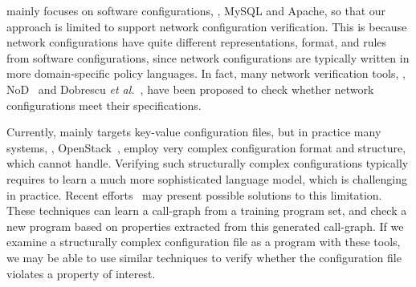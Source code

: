 \app mainly focuses on software configurations, \eg, MySQL and Apache,
so that our approach is limited to support network configuration
verification. This is because network configurations have quite
different representations, format, and rules from software configurations,
since network configurations are typically written in 
more domain-specific policy languages.
In fact, many network verification tools, 
\eg, NoD~\cite{lopes15checking} and 
Dobrescu {\em et al.}~\cite{dobrescu14software},
have been proposed to check whether network configurations
meet their specifications.

Currently, \app mainly targets key-value configuration files,
but in practice many systems, \eg, OpenStack~\cite{OpenStack},
employ very complex configuration format and structure,
which \app cannot handle.
Verifying such structurally complex configurations typically requires 
\app to learn a much more sophisticated language model,
which is challenging in practice.
Recent efforts~\cite{raychev15predicting, raychev16learning} 
may present possible solutions to this limitation.
These techniques can learn a call-graph from a training program set,
and check a new program based on properties extracted from this
generated call-graph. If we examine a structurally complex configuration 
file as a program with these tools, we may be able to use similar techniques 
to verify whether the configuration file violates a property of interest. 
